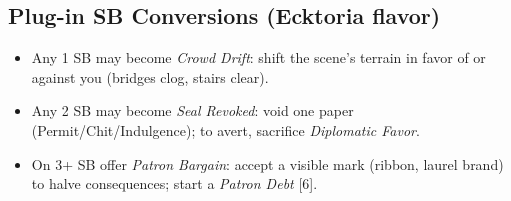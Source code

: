 \subsection*{Plug-in SB Conversions (Ecktoria flavor)}
\begin{itemize}
  \item Any 1 SB may become \emph{Crowd Drift}: shift the scene’s terrain in favor of or against you (bridges clog, stairs clear).
  \item Any 2 SB may become \emph{Seal Revoked}: void one paper (Permit/Chit/Indulgence); to avert, sacrifice \emph{Diplomatic Favor}.
  \item On 3+ SB offer \emph{Patron Bargain}: accept a visible mark (ribbon, laurel brand) to halve consequences; start a \emph{Patron Debt} [6].
\end{itemize}